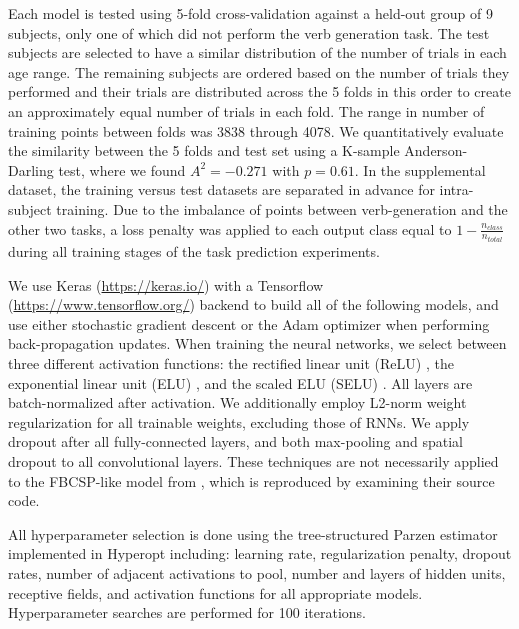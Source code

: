 \documentclass[fleqn,10pt]{wlscirep}
\begin{document}
Each model is tested using 5-fold cross-validation against a held-out group of 9 subjects, only one of which did not perform the verb generation task. The test subjects are selected to have a similar distribution of the number of trials in each age range. The remaining subjects are ordered based on the number of trials they performed and their trials are distributed across the 5 folds in this order to create an approximately equal number of trials in each fold. The range in number of training points between folds was 3838 through 4078. We quantitatively evaluate the similarity between the 5 folds and test set using a K-sample Anderson-Darling test, where we found $A^2=-0.271$ with $p=0.61$. In the supplemental dataset, the training versus test datasets are separated in advance for intra-subject training. Due to the imbalance of points between verb-generation and the other two tasks, a loss penalty was applied to each output class equal to $1-\frac{n_{class}}{n_{total}}$ during all training stages of the task prediction experiments.

We use Keras (\url{https://keras.io/}) with a Tensorflow (\url{https://www.tensorflow.org/}) backend to build all of the following models, and use either stochastic gradient descent or the Adam optimizer\cite{Kingma2015} when performing back-propagation updates. When training the neural networks, we select between three different activation functions: the rectified linear unit (ReLU) \cite{He2015a}, the exponential linear unit (ELU) \cite{Clevert}, and the scaled ELU (SELU) \cite{NIPS2017_6698}. All layers are batch-normalized \cite{Szegedy2015} after activation. We additionally employ L2-norm weight regularization for all trainable weights, excluding those of RNNs. We apply dropout \cite{Srivastava2014} after all fully-connected layers, and both max-pooling and spatial dropout \cite{Tompson2015} to all convolutional layers. These techniques are not necessarily applied to the FBCSP-like model from \cite{Schirrmeister2017}, which is reproduced by examining their source code.

All hyperparameter selection is done using the tree-structured Parzen estimator implemented in Hyperopt \cite{Bergstra2013} including: learning rate, regularization penalty, dropout rates, number of adjacent activations to pool, number and layers of hidden units, receptive fields, and activation functions for all appropriate models. Hyperparameter searches are performed for 100 iterations.


\end{document}
